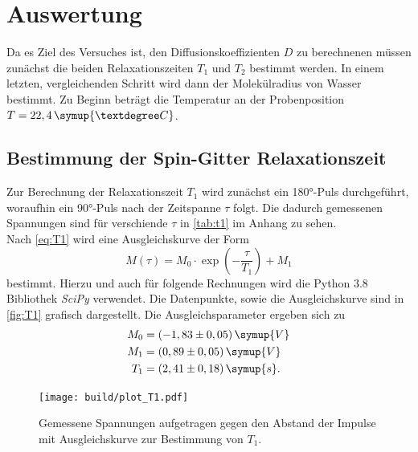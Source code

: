\section{Auswertung}
Da es Ziel des Versuches ist, den Diffusionskoeffizienten $D$ zu berechnenen müssen zunächst die beiden 
Relaxationszeiten $T_1$ und $T_2$ bestimmt werden. In einem letzten, vergleichenden Schritt wird dann 
der Molekülradius von Wasser bestimmt.
Zu Beginn beträgt die Temperatur an der Probenposition $T = 22,4\,\symup{°C}$. 
\subsection{Bestimmung der Spin-Gitter Relaxationszeit} 
Zur Berechnung der Relaxationszeit $T_1$ wird zunächst ein 180°-Puls durchgeführt, woraufhin ein 90°-Puls 
nach der Zeitspanne $\tau$ folgt. Die dadurch gemessenen Spannungen sind für verschiende $\tau$ in \autoref{tab:t1} im Anhang
zu sehen. \\
Nach \autoref{eq:T1} wird eine Ausgleichskurve der Form 
\begin{equation*}
    M(\tau) = M_0 \cdot \exp \left( -\frac{\tau}{T_1} \right) + M_1
\end{equation*}
bestimmt. Hierzu und auch für folgende Rechnungen wird die Python 3.8 Bibliothek \textit{SciPy}\cite{scipy}
verwendet. Die Datenpunkte, sowie die Ausgleichskurve sind in \autoref{fig:T1} grafisch dargestellt.
Die Ausgleichsparameter ergeben sich zu 
\begin{align*}
    M_0 &= (-1,83 \pm 0,05) \, \symup{V} \\
    M_1 &= (0,89 \pm 0,05) \, \symup{V} \\
    T_1 &= (2,41 \pm 0,18) \, \symup{s}.
\end{align*}
\begin{figure}
    \centering
    \texttt{[image: build/plot\_T1.pdf]}
    \caption{Gemessene Spannungen aufgetragen gegen den Abstand der Impulse mit Ausgleichskurve zur Bestimmung von $T_1$.}
    \label{fig:T1}
\end{figure}

